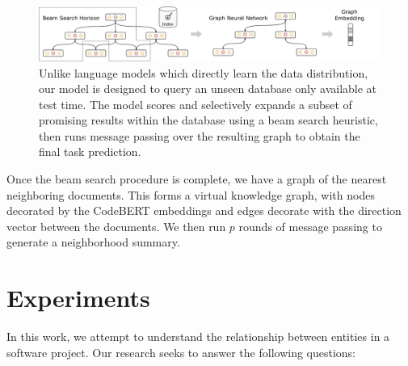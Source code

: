 \documentclass[11pt]{article}
\begin{document}
\begin{figure}[H]
  \centering
  \includegraphics[width=1.05\textwidth]{architecture}
  \caption{Unlike language models which directly learn the data distribution, our model is designed to query an unseen database only available at test time. The model scores and selectively expands a subset of promising results within the database using a beam search heuristic, then runs message passing over the resulting graph to obtain the final task prediction.}
\end{figure}

Once the beam search procedure is complete, we have a graph of the nearest neighboring documents. This forms a virtual knowledge graph, with nodes decorated by the CodeBERT embeddings and edges decorate with the direction vector between the documents. We then run $p$ rounds of message passing to generate a neighborhood summary.

%

\section{Experiments}

In this work, we attempt to understand the relationship between entities in a software project. Our research seeks to answer the following questions:
\end{document}

